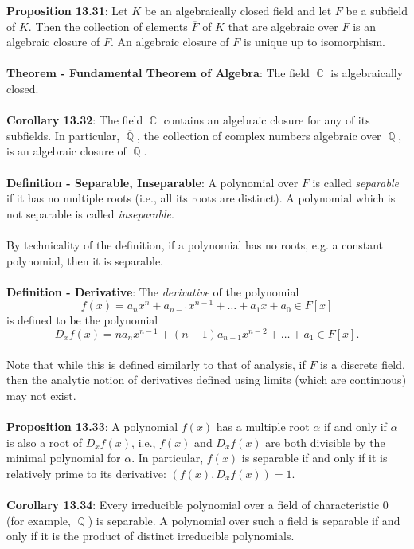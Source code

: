 \documentclass{article}
\DeclareMathOperator{\Q}{\mathbb{Q}}
\DeclareMathOperator{\C}{\mathbb{C}}
\begin{document}
\textbf{Proposition 13.31}: Let $K$ be an algebraically closed field and let $F$ be a subfield of $K$. Then the collection of elements $\overline{F}$ of $K$ that are algebraic over $F$ is an algebraic closure of $F$. An algebraic closure of $F$ is unique up to isomorphism. \\ \\
\textbf{Theorem - Fundamental Theorem of Algebra}: The field $\C$ is algebraically closed. \\ \\
\textbf{Corollary 13.32}: The field $\C$ contains an algebraic closure for any of its subfields. In particular, $\overline{\Q}$, the collection of complex numbers algebraic over $\Q$, is an algebraic closure of $\Q$. \\ \\
\textbf{Definition - Separable, Inseparable}: A polynomial over $F$ is called \textit{separable} if it has no multiple roots (i.e., all its roots are distinct). A polynomial which is not separable is called \textit{inseparable}. \\ \\
By technicality of the definition, if a polynomial has no roots, e.g. a constant polynomial, then it is separable. \\ \\
\textbf{Definition - Derivative}: The \textit{derivative} of the polynomial $$f(x) = a_n x^n + a_{n - 1}x^{n - 1} + \dots + a_1x + a_0 \in F[x]$$ is defined to be the polynomial $$D_x f(x) = na_n x^{n - 1} + (n - 1)a_{n - 1}x^{n - 2} + \dots + a_1\in F[x].$$ \\
Note that while this is defined similarly to that of analysis, if $F$ is a discrete field, then the analytic notion of derivatives defined using limits (which are continuous) may not exist. \\ \\
\textbf{Proposition 13.33}: A polynomial $f(x)$ has a multiple root $\alpha$ if and only if $\alpha$ is also a root of $D_x f(x)$, i.e., $f(x)$ and $D_x f(x)$ are both divisible by the minimal polynomial for $\alpha$. In particular, $f(x)$ is separable if and only if it is relatively prime to its derivative: $(f(x), D_x f(x)) = 1$. \\ \\
\textbf{Corollary 13.34}: Every irreducible polynomial over a field of characteristic 0 (for example, $\Q$) is separable. A polynomial over such a field is separable if and only if it is the product of distinct irreducible polynomials. \\ \\
\end{document}
